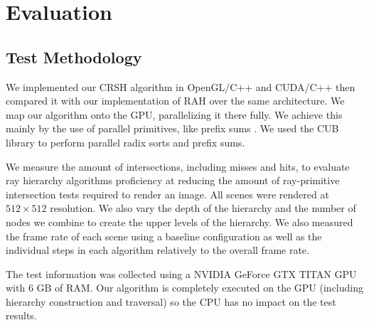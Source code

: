 
\chapter{Evaluation}
\label{chapter:evaluation}

\section{Test Methodology}
\label{section:test-methodology}

We implemented our CRSH algorithm in OpenGL/C++ and CUDA/C++ then compared it with our implementation of RAH \cite{Roger07} over the same architecture. We map our algorithm onto the GPU, parallelizing it there fully. We achieve this mainly by the use of parallel primitives, like prefix sums \cite{Blelloch90}. We used the CUB \cite{Merrill09}  \cite{Merrill11} library to perform parallel radix sorts and prefix sums.

\medskip

We measure the amount of intersections, including misses and hits, to evaluate ray hierarchy algorithms proficiency at reducing the amount of ray-primitive intersection tests required to render an image. All scenes were rendered at $512\times512$ resolution. We also vary the depth of the hierarchy and the number of nodes we combine to create the upper levels of the hierarchy. We also measured the frame rate of each scene using a baseline configuration as well as the individual steps in each algorithm relatively to the overall frame rate.

\medskip

The test information was collected using a NVIDIA GeForce GTX TITAN GPU with 6 GB of RAM. Our algorithm is completely executed on the GPU (including hierarchy construction and traversal) so the CPU has no impact on the test results.

